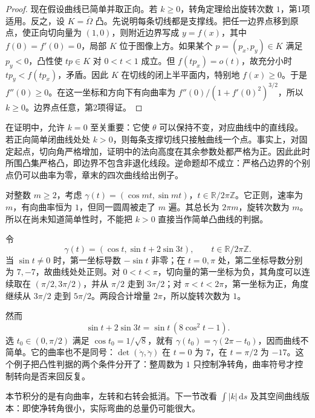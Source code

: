 \begin{proof}
	现在假设曲线已简单并取正向。若 \(k\geq0\)，转角定理给出旋转次数 \(1\)，第1项适用。反之，设 \(K=\overline\Omega\) 凸。先说明每条切线都是支撑线。把任一边界点移到原点，使正向切向量为 \((1,0)\)，则附近边界写成 \(y=f(x)\)，其中 \(f(0)=f'(0)=0\)，局部 \(K\) 位于图像上方。如果某个 \(p=(p_x,p_y)\in K\) 满足 \(p_y<0\)，凸性使 \(tp\in K\) 对 \(0<t<1\) 成立。但 \(f(tp_x)=o(t)\)，故充分小时 \(tp_y<f(tp_x)\)，矛盾。因此 \(K\) 在切线的闭上半平面内，特别地 \(f(x)\geq0\)。于是 \(f''(0)\geq0\)。在这一坐标和方向下有向曲率为 \(f''(0)/(1+f'(0)^2)^{3/2}\)，所以 \(k\geq0\)。边界点任意，第2项得证。
\end{proof}

在证明中，允许 \(k=0\) 至关重要：它使 \(\theta\) 可以保持不变，对应曲线中的直线段。若正向简单闭曲线处处 \(k>0\)，则每条支撑切线只接触曲线一个点。事实上，对固定起点，切向角严格增加，证明中的法向高度在其余参数处都严格为正。因此此时所围凸集严格凸，即边界不包含非退化线段。逆命题却不成立：严格凸边界的个别点仍可以曲率为零，章末的四次曲线给出例子。

\begin{example}\label{g1:exm:multiple-circle-turning}
	对整数 \(m\geq2\)，考虑 \(\gamma(t)=(\cos mt,\sin mt)\)，\(t\in\mathbb R/2\pi\mathbb Z\)。它正则，速率为 \(m\)，有向曲率恒为 \(1\)，但同一圆周被走了 \(m\) 遍。其总长为 \(2\pi m\)，旋转次数为 \(m\)。所以在尚未知道简单性时，不能把 \(k>0\) 直接当作简单凸曲线的判据。
\end{example}

\begin{example}\label{g1:exm:rotation-one-self-intersection}
	令
	\[
		\gamma(t)=(\cos t,\sin t+2\sin3t),\qquad t\in\mathbb R/2\pi\mathbb Z.
	\]
	当 \(\sin t\ne0\) 时，第一坐标导数 \(-\sin t\) 非零；在 \(t=0,\pi\) 处，第二坐标导数分别为 \(7,-7\)，故曲线处处正则。对 \(0<t<\pi\)，切向量的第一坐标为负，其角度可以连续取在 \((\pi/2,3\pi/2)\)，并从 \(\pi/2\) 走到 \(3\pi/2\)；对 \(\pi<t<2\pi\)，第一坐标为正，角度继续从 \(3\pi/2\) 走到 \(5\pi/2\)。两段合计增量 \(2\pi\)，所以旋转次数为 \(1\)。

	然而
	\[
		\sin t+2\sin3t=\sin t\,(8\cos^2t-1).
	\]
	选 \(t_0\in(0,\pi/2)\) 满足 \(\cos t_0=1/\sqrt8\)，就有 \(\gamma(t_0)=\gamma(2\pi-t_0)\)，因而曲线不简单。它的曲率也不是同号：\(\det(\dot\gamma,\ddot\gamma)\) 在 \(t=0\) 为 \(7\)，在 \(t=\pi/2\) 为 \(-17\)。这个例子把凸性判据的两个条件分开了：整周数为 \(1\) 只控制净转角，曲率符号才控制转向是否来回反复。
\end{example}

本节积分的是有向曲率，左转和右转会抵消。下一节改看 \(\int|k|\,\mathrm{d}s\) 及其空间曲线版本：即使净转角很小，实际弯曲的总量仍可能很大。
